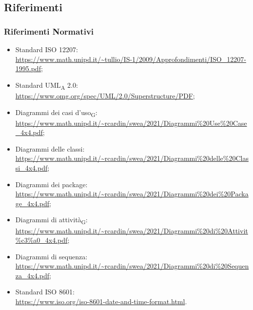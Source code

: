 \subsection{Riferimenti}
\label{ref}
    \subsubsection{Riferimenti Normativi}
        \begin{itemize}
            \item Standard ISO 12207:\\ \url{https://www.math.unipd.it/~tullio/IS-1/2009/Approfondimenti/ISO_12207-1995.pdf};
            \item Standard UML\textsubscript{A} 2.0:\\\url{https://www.omg.org/spec/UML/2.0/Superstructure/PDF};
            \item Diagrammi dei casi d'uso\textsubscript{G}:\\\url{https://www.math.unipd.it/~rcardin/swea/2021/Diagrammi\%20Use\%20Case_4x4.pdf};
            \item Diagrammi delle classi:\\\url{https://www.math.unipd.it/~rcardin/swea/2021/Diagrammi\%20delle\%20Classi_4x4.pdf};
            \item Diagrammi dei package:\\\url{https://www.math.unipd.it/~rcardin/swea/2021/Diagrammi\%20dei\%20Package_4x4.pdf};
            \item Diagrammi di attività\textsubscript{G}:\\\url{https://www.math.unipd.it/~rcardin/swea/2021/Diagrammi\%20di\%20Attivit\%c3\%a0_4x4.pdf};
            \item Diagrammi di sequenza:\\\url{https://www.math.unipd.it/~rcardin/swea/2021/Diagrammi\%20di\%20Sequenza_4x4.pdf};
            \item Standard ISO 8601:\\\url{https://www.iso.org/iso-8601-date-and-time-format.html}.
        \end{itemize}

